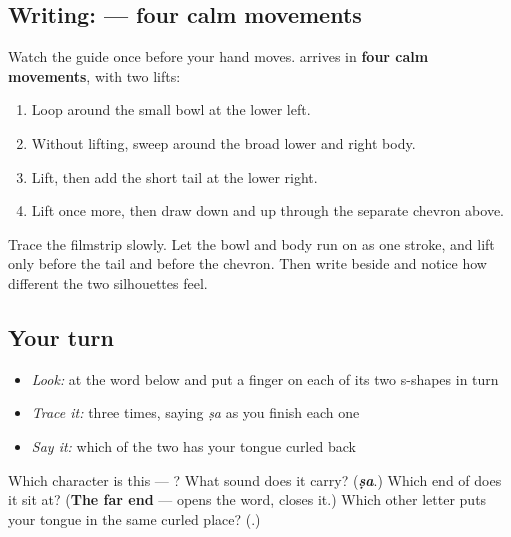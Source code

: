 \subsection*{Writing:  — four calm movements}

Watch the guide once before your hand moves.  arrives in \textbf{four calm movements}, with two lifts:

\begin{enumerate}
\raggedright
  \item Loop around the small bowl at the lower left.
  \item Without lifting, sweep around the broad lower and right body.
  \item Lift, then add the short tail at the lower right.
  \item Lift once more, then draw down and up through the separate chevron above.
\end{enumerate}

Trace the filmstrip slowly. Let the bowl and body run on as one stroke, and lift only before the tail and before the chevron. Then write  beside  and notice how different the two silhouettes feel.

\subsection*{Your turn}
\begin{itemize}
\raggedright
  \item \emph{Look:} at the word below and put a finger on each of its two s-shapes in turn
\end{itemize}

\begin{quote}
\end{quote}

\begin{itemize}
\raggedright
  \item \emph{Trace it:}  three times, saying \emph{ṣa} as you finish each one
  \item \emph{Say it:} which of the two has your tongue curled back
\end{itemize}

\begin{tcolorbox}[breakable,colback=teal!4,colframe=teal!35!black,title={Before you move on}]
Which character is this — ? What sound does it carry? (\emph{\textbf{ṣa}}.) Which end of \textbf{} does it sit at? (\textbf{The far end} —  opens the word,  closes it.) Which other letter puts your tongue in the same curled place? (\textbf{}.)
\end{tcolorbox}
